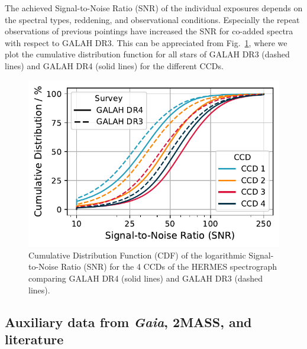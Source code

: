 \documentclass[
  journal=pasa,
  manuscript=research-paper, %
  year=2024,
  volume=37
]{cup-journal}
\newcommand{\Gaia}{\textit{Gaia}\xspace}
\begin{document}
The achieved Signal-to-Noise Ratio (SNR) of the individual exposures depends on the spectral types, reddening, and observational conditions. Especially the repeat observations of previous pointings have increased the SNR for co-added spectra with respect to GALAH DR3. This can be appreciated from Fig.~\ref{fig:snr_distribution}, where we plot the cumulative distribution function for all stars of GALAH DR3 (dashed lines) and GALAH DR4 (solid lines) for the different CCDs. 

\begin{figure}[ht]
    \centering
    \includegraphics[width=\columnwidth]{figures/snr_distribution.pdf}
    \caption{Cumulative Distribution Function (CDF) of the logarithmic Signal-to-Noise Ratio (SNR) for the 4 CCDs of the HERMES spectrograph comparing GALAH DR4 (solid lines) and GALAH DR3 (dashed lines).}
    \label{fig:snr_distribution}
\end{figure}

\subsection{Auxiliary data from \Gaia, 2MASS, and literature} \label{sec:non-spec_data}

\end{document}
